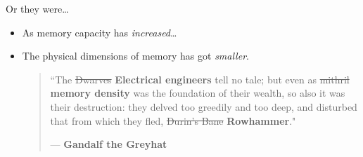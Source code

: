 \documentclass[9pt,aspectratio=169]{beamer}
\renewcommand{\alert}[1]{\textbf{#1}}
\begin{document}
\begin{frame}[label={sec:orgf4b673f}]{Or they were\ldots{}}
\begin{itemize}
\item As memory capacity has \emph{increased}\ldots{}
\item The physical dimensions of memory has got \emph{smaller}.

\vfill
\begin{quote}
``The \sout{Dwarves} \alert{Electrical engineers} tell no tale; but even as \sout{mithril}
\alert{memory density} was the foundation of their wealth, so also it was
their destruction: they delved too greedily and too deep, and
disturbed that from which they fled, \sout{Durin's Bane} \alert{Rowhammer}."

--- \alert{Gandalf the Greyhat}
\end{quote}
\end{itemize}
\end{frame}
\end{document}
